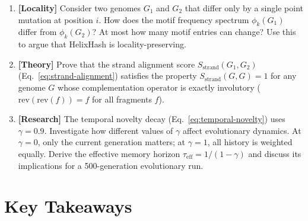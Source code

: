 \begin{enumerate}[label=\textbf{8.\arabic*.}, leftmargin=2.5em]
\item \textbf{[Locality]} Consider two genomes $G_1$ and $G_2$ that differ only by a single point mutation at position $i$. How does the motif frequency spectrum $\phi_k(G_1)$ differ from $\phi_k(G_2)$? At most how many motif entries can change? Use this to argue that HelixHash is locality-preserving.

\item \textbf{[Theory]} Prove that the strand alignment score $S_{\text{strand}}(G_1, G_2)$ (Eq.~\ref{eq:strand-alignment}) satisfies the property $S_{\text{strand}}(G, G) = 1$ for any genome $G$ whose complementation operator is exactly involutory ($\mathrm{rev}(\mathrm{rev}(f)) = f$ for all fragments $f$).

\item \textbf{[Research]} The temporal novelty decay (Eq.~\ref{eq:temporal-novelty}) uses $\gamma = 0.9$. Investigate how different values of $\gamma$ affect evolutionary dynamics. At $\gamma = 0$, only the current generation matters; at $\gamma = 1$, all history is weighted equally. Derive the effective memory horizon $\tau_{\text{eff}} = 1 / (1 - \gamma)$ and discuss its implications for a 500-generation evolutionary run.

\end{enumerate}

\section{Key Takeaways}

